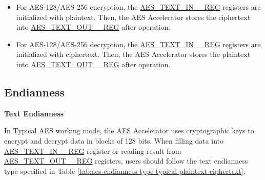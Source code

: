 \documentclass[main\_\_EN.tex]{subfiles}
\begin{document}
\begin{itemize}
    \item For AES-128/AES-256 encryption, the \hyperref[regdesc:AESTEXTINnREG]{AES\_TEXT\_IN\_\_REG} registers are initialized with plaintext. Then, the AES Accelerator stores the ciphertext into \hyperref[regdesc:AESTEXTOUTnREG]{AES\_TEXT\_OUT\_\_REG} after operation.
    \item For AES-128/AES-256 decryption, the \hyperref[regdesc:AESTEXTINnREG]{AES\_TEXT\_IN\_\_REG} registers are initialized with ciphertext. Then, the AES Accelerator stores the plaintext into \hyperref[regdesc:AESTEXTOUTnREG]{AES\_TEXT\_OUT\_\_REG} after operation.
\end{itemize}


\subsection{Endianness}

\textbf{Text Endianness}

In Typical AES working mode, the AES Accelerator uses cryptographic keys to encrypt and decrypt data in blocks of 128 bits. 
When filling data into \hyperref[regdesc:AESTEXTINnREG]{AES\_TEXT\_IN\_\_REG} register or reading result from \hyperref[regdesc:AESTEXTINnREG]{AES\_TEXT\_OUT\_\_REG} registers, users should follow the text endianness type specified in Table \ref{tab:aes-endianness-type-typical-plaintext-ciphertext}.

\end{document}
